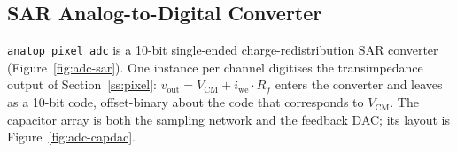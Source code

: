 %
%
%
%

\subsection{SAR Analog-to-Digital Converter}\label{ss:adc}

\texttt{anatop\_pixel\_adc} is a 10-bit single-ended charge-redistribution SAR
converter (Figure~\ref{fig:adc-sar}). One instance per channel digitises the
transimpedance output of Section~\ref{ss:pixel}: $v_{\mathrm{out}} =
V_{\mathrm{CM}} + i_{\mathrm{we}}\cdot R_f$ enters the converter and leaves as a
10-bit code, offset-binary about the code that corresponds to
$V_{\mathrm{CM}}$. The capacitor array is both the sampling network and the
feedback DAC; its layout is Figure~\ref{fig:adc-capdac}.


